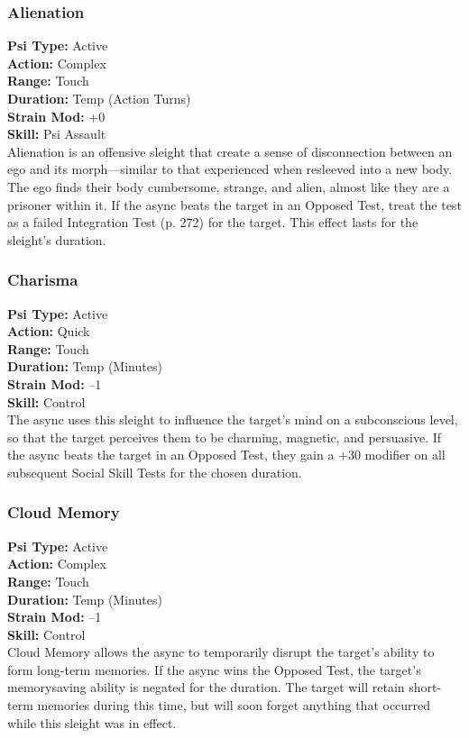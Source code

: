 \subsubsection{Alienation} \textbf{Psi Type:} Active \\ \textbf{Action:} Complex \\ \textbf{Range:} Touch \\ \textbf{Duration:} Temp (Action Turns) \\ \textbf{Strain Mod:} +0 \\ \textbf{Skill:} Psi Assault \\ Alienation is an offensive sleight that create a sense of disconnection between an ego and its morph—similar to that experienced when resleeved into a new body. The ego finds their body cumbersome, strange, and alien, almost like they are a prisoner within it. If the async beats the target in an Opposed Test, treat the test as a failed Integration Test (p. 272) for the target. This effect lasts for the sleight’s duration. 

\subsubsection{Charisma} \textbf{Psi Type:} Active \\ \textbf{Action:} Quick \\ \textbf{Range:} Touch \\ \textbf{Duration:} Temp (Minutes) \\ \textbf{Strain Mod:} –1 \\ \textbf{Skill:} Control\\ The async uses this sleight to influence the target’s mind on a subconscious level, so that the target perceives them to be charming, magnetic, and persuasive. If the async beats the target in an Opposed Test, they gain a +30 modifier on all subsequent Social Skill Tests for the chosen duration. 

\subsubsection{Cloud Memory} \textbf{Psi Type:} Active \\ \textbf{Action:} Complex \\ \textbf{Range:} Touch \\ \textbf{Duration:} Temp (Minutes) \\ \textbf{Strain Mod:} –1 \\ \textbf{Skill:} Control\\ Cloud Memory allows the async to temporarily disrupt the target’s ability to form long-term memories. If the async wins the Opposed Test, the target’s memorysaving ability is negated for the duration. The target will retain short-term memories during this time, but will soon forget anything that occurred while this sleight was in effect. 

